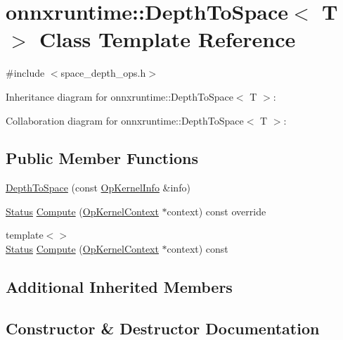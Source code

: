 \hypertarget{classonnxruntime_1_1DepthToSpace}{}\section{onnxruntime\+:\+:Depth\+To\+Space$<$ T $>$ Class Template Reference}
\label{classonnxruntime_1_1DepthToSpace}


{\ttfamily \#include $<$space\+\_\+depth\+\_\+ops.\+h$>$}



Inheritance diagram for onnxruntime\+:\+:Depth\+To\+Space$<$ T $>$\+:


Collaboration diagram for onnxruntime\+:\+:Depth\+To\+Space$<$ T $>$\+:
\subsection*{Public Member Functions}
\begin{DoxyCompactItemize}
\item 
\mbox{\hyperlink{classonnxruntime_1_1DepthToSpace_a47d0cdef47ff27dad4acc4e2937ddea5}{Depth\+To\+Space}} (const \mbox{\hyperlink{classonnxruntime_1_1OpKernelInfo}{Op\+Kernel\+Info}} \&info)
\item 
\mbox{\hyperlink{classonnxruntime_1_1common_1_1Status}{Status}} \mbox{\hyperlink{classonnxruntime_1_1DepthToSpace_a62307a76d073d6835daeca88bc972e20}{Compute}} (\mbox{\hyperlink{classonnxruntime_1_1OpKernelContext}{Op\+Kernel\+Context}} $\ast$context) const override
\item 
{\footnotesize template$<$$>$ }\\\mbox{\hyperlink{classonnxruntime_1_1common_1_1Status}{Status}} \mbox{\hyperlink{classonnxruntime_1_1DepthToSpace_a8d233090f3988849495a1ae4f4c15745}{Compute}} (\mbox{\hyperlink{classonnxruntime_1_1OpKernelContext}{Op\+Kernel\+Context}} $\ast$context) const
\end{DoxyCompactItemize}
\subsection*{Additional Inherited Members}


\subsection{Constructor \& Destructor Documentation}
\mbox{\label{classonnxruntime_1_1DepthToSpace_a47d0cdef47ff27dad4acc4e2937ddea5}} 
